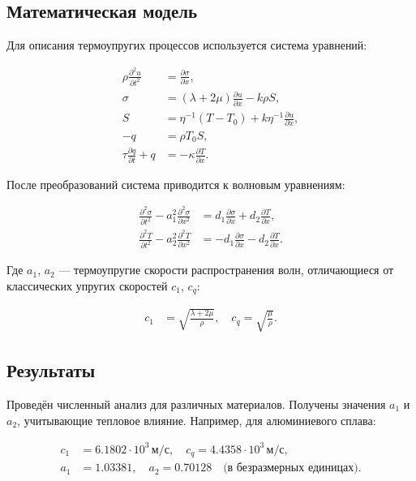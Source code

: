 \subsection*{Математическая модель}
Для описания термоупругих процессов используется система уравнений:

\begin{align}
\rho \frac{\partial^2 u}{\partial t^2} &= \frac{\partial \sigma}{\partial x}, \\
\sigma &= (\lambda + 2\mu) \frac{\partial u}{\partial x} - k \rho S, \\
S &= \eta^{-1}(T - T_0) + k \eta^{-1} \frac{\partial u}{\partial x}, \\
-q &= \rho T_0 S, \\
\tau \frac{\partial q}{\partial t} + q &= -\kappa \frac{\partial T}{\partial x}.
\end{align}

После преобразований система приводится к волновым уравнениям:

\begin{align}
\frac{\partial^2 \sigma}{\partial t^2} - a_1^2 \frac{\partial^2 \sigma}{\partial x^2} &= d_1 \frac{\partial \sigma}{\partial x} + d_2 \frac{\partial T}{\partial x}, \\
\frac{\partial^2 T}{\partial t^2} - a_2^2 \frac{\partial^2 T}{\partial x^2} &= -d_1 \frac{\partial \sigma}{\partial x} - d_2 \frac{\partial T}{\partial x}.
\end{align}

Где $a_1$, $a_2$ — термоупругие скорости распространения волн, отличающиеся от классических упругих скоростей $c_1$, $c_q$:

\begin{align}
c_1 &= \sqrt{\frac{\lambda + 2\mu}{\rho}}, \quad
c_q = \sqrt{\frac{\mu}{\rho}}.
\end{align}

\subsection*{Результаты}
Проведён численный анализ для различных материалов. Получены значения $a_1$ и $a_2$, учитывающие тепловое влияние. Например, для алюминиевого сплава:

\begin{align*}
c_1 &= 6.1802 \cdot 10^3 \, \text{м/с}, \quad
c_q = 4.4358 \cdot 10^3 \, \text{м/с}, \\
a_1 &= 1.03381, \quad
a_2 = 0.70128 \quad \text{(в безразмерных единицах)}.
\end{align*}

